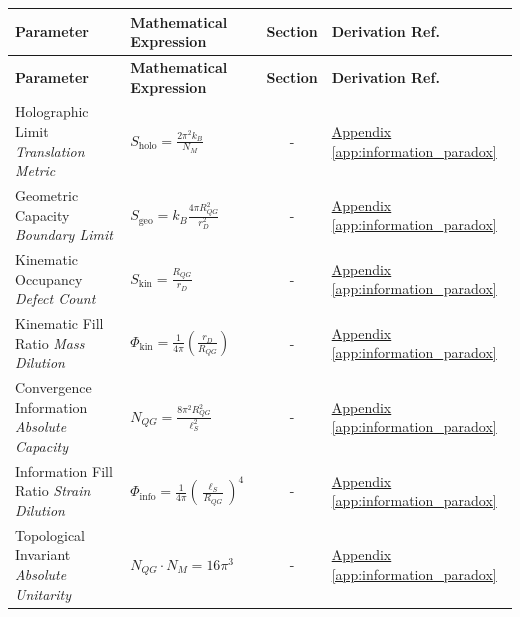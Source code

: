 \vspace{0.5cm}
\noindent
\renewcommand{\arraystretch}{1.6}
\begin{longtable}{@{} p{4.5cm} p{6cm} c p{4cm} @{}}
\toprule
\textbf{Parameter} & \textbf{Mathematical Expression} & \textbf{Section} & \textbf{Derivation Ref.} \\
\midrule
\endfirsthead

\toprule
\textbf{Parameter} & \textbf{Mathematical Expression} & \textbf{Section} & \textbf{Derivation Ref.} \\
\midrule
\endhead

Holographic Limit \newline \textit{Translation Metric} & $S_{\text{holo}} = \frac{2\pi^2 k_B}{N_M}$ & - & \hyperref[app:information_paradox]{Appendix \ref*{app:information_paradox}} \\

Geometric Capacity \newline \textit{Boundary Limit} & $S_{\text{geo}} = k_B \frac{4\pi R_{QG}^2}{r_D^2}$ & - & \hyperref[app:information_paradox]{Appendix \ref*{app:information_paradox}} \\

Kinematic Occupancy \newline \textit{Defect Count} & $S_{\text{kin}} = \frac{R_{QG}}{r_D}$ & - & \hyperref[app:information_paradox]{Appendix \ref*{app:information_paradox}} \\

Kinematic Fill Ratio \newline \textit{Mass Dilution} & $\Phi_{\text{kin}} = \frac{1}{4\pi} \left(\frac{r_D}{R_{QG}}\right)$ & - & \hyperref[app:information_paradox]{Appendix \ref*{app:information_paradox}} \\

Convergence Information \newline \textit{Absolute Capacity} & $N_{QG} = \frac{8\pi^2 R_{QG}^2}{\ell_S^2}$ & - & \hyperref[app:information_paradox]{Appendix \ref*{app:information_paradox}} \\

Information Fill Ratio \newline \textit{Strain Dilution} & $\Phi_{\text{info}} = \frac{1}{4\pi} \left( \frac{\ell_S}{R_{QG}} \right)^4$ & - & \hyperref[app:information_paradox]{Appendix \ref*{app:information_paradox}} \\

Topological Invariant \newline \textit{Absolute Unitarity} & $N_{QG} \cdot N_M = 16\pi^3$ & - & \hyperref[app:information_paradox]{Appendix \ref*{app:information_paradox}} \\

\bottomrule
\end{longtable}


